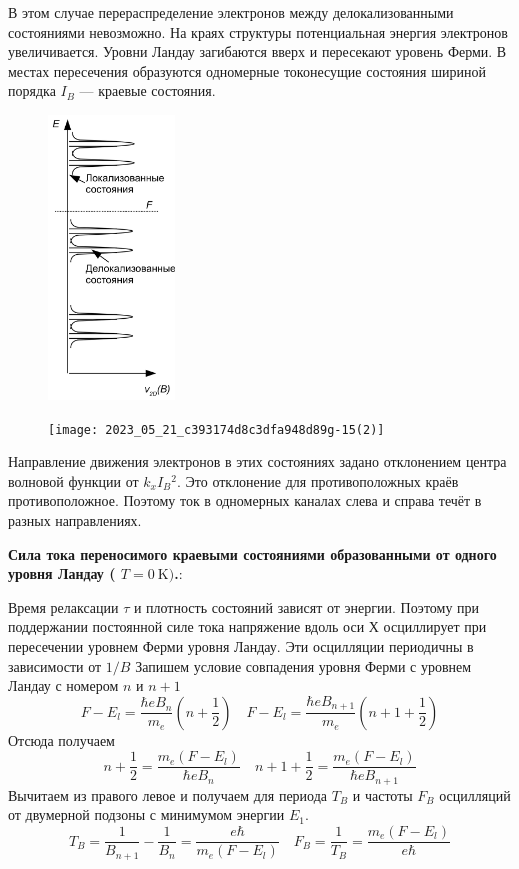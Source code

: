 В этом случае перераспределение электронов между
делокализованными состояниями невозможно. На краях
структуры потенциальная энергия электронов увеличивается. Уровни Ландау загибаются вверх и пересекают уровень Ферми. В местах пересечения образуются одномерные токонесущие состояния шириной порядка $I_B$ --- краевые состояния.
\begin{figure}[h!]
    \centering
    \includegraphics[width=0.3\textwidth]{images/ph29.2.jpg}
\end{figure}
\begin{figure}[h!]
    \centering
    \texttt{[image: 2023\_05\_21\_c393174d8c3dfa948d89g-15(2)]}
\end{figure}

Направление движения электронов в этих состояниях задано отклонением центра волновой функции от $k_{x} I_{B}{ }^{2}$. Это отклонение для противоположных краёв
противоположное. Поэтому ток в одномерных каналах слева и справа течёт в разных направлениях. 

\textbf{Сила тока переносимого краевыми состояниями образованными от одного уровня Ландау ( $T=0 \mathrm{~K})$.}:

Время релаксации $\tau$ и плотность состояний зависят от энергии. Поэтому при поддержании постоянной силе тока напряжение вдоль оси Х осциллирует при пересечении уровнем Ферми уровня Ландау.
Эти осцилляции периодичны в зависимости от $1 / B$
Запишем условие совпадения уровня Ферми с уровнем Ландау с номером $n$ и $n+1$
$$
F-E_l=\frac{\hbar e B_n}{m_e}\left(n+\frac{1}{2}\right) \quad F-E_l=\frac{\hbar e B_{n+1}}{m_e}\left(n+1+\frac{1}{2}\right)
$$
Отсюда получаем
$$
n+\frac{1}{2}=\frac{m_e\left(F-E_l\right)}{\hbar e B_n} \quad n+1+\frac{1}{2}=\frac{m_e\left(F-E_l\right)}{\hbar e B_{n+1}}
$$
Вычитаем из правого левое и получаем для периода $T_B$ и частоты $F_B$ осцилляций от двумерной подзоны с минимумом энергии $E_1$.
$$
T_B=\frac{1}{B_{n+1}}-\frac{1}{B_n}=\frac{e \hbar}{m_e\left(F-E_l\right)} \quad F_B=\frac{1}{T_B}=\frac{m_e\left(F-E_l\right)}{e \hbar}
$$

